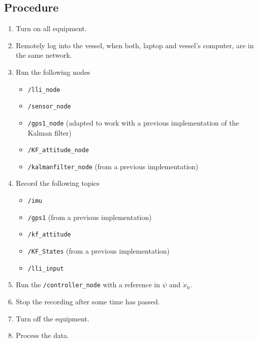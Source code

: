 \subsection*{Procedure}
\begin{enumerate}
    \item Turn on all equipment.
    \item Remotely log into the vessel, when both, laptop and vessel's computer, are in the same network.
    \item Run the following nodes
    \begin{itemize}
        \item \lstinline[style=cinline]{/lli_node}
        \item \lstinline[style=cinline]{/sensor_node}
        \item \lstinline[style=cinline]{/gps1_node} (adapted to work with a previous implementation of the Kalman filter)
        \item \lstinline[style=cinline]{/KF_attitude_node}
        \item \lstinline[style=cinline]{/kalmanfilter_node} (from a previous implementation)
    \end{itemize}
    \item Record the following topics
    \begin{itemize}
        \item \lstinline[style=cinline]{/imu}   
        \item \lstinline[style=cinline]{/gps1} (from a previous implementation)
        \item \lstinline[style=cinline]{/kf_attitude}
        \item \lstinline[style=cinline]{/KF_States} (from a previous implementation)  
        \item \lstinline[style=cinline]{/lli_input}  
    \end{itemize}
    \item Run the \lstinline[style=cinline]{/controller_node} with a reference in $\psi$ and $\dot{x}_\mathrm{b}$.
    \item Stop the recording after some time has passed.
    \item Turn off the equipment.
    \item Process the data.
\end{enumerate}

